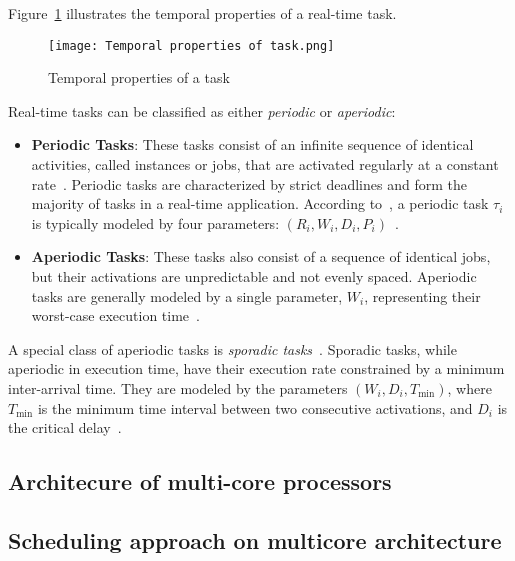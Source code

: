 \documentclass[conference]{IEEEtran}
\begin{document}
Figure~\ref{fig:temporal_properties_of_task} illustrates the temporal properties of a real-time task.

\begin{figure}[h!]
    \centering
    \texttt{[image: Temporal properties of task.png]}
    \caption{Temporal properties of a task}
    \label{fig:temporal_properties_of_task}
\end{figure}

Real-time tasks can be classified as either \textit{periodic} or \textit{aperiodic}:
\begin{itemize}
    \item \textbf{Periodic Tasks}: These tasks consist of an infinite sequence of identical activities, called instances or jobs, that are activated regularly at a constant rate~\cite{butazo99}. Periodic tasks are characterized by strict deadlines and form the majority of tasks in a real-time application. According to~\cite{french18}, a periodic task $\tau_i$ is typically modeled by four parameters: $(R_i, W_i, D_i, P_i)$~\cite{AbdallahGB24}.
    
    \item \textbf{Aperiodic Tasks}: These tasks also consist of a sequence of identical jobs, but their activations are unpredictable and not evenly spaced. Aperiodic tasks are generally modeled by a single parameter, $W_i$, representing their worst-case execution time~\cite{AbdallahGB24}.
\end{itemize}

A special class of aperiodic tasks is \textit{sporadic tasks}~\cite{butazo99}. Sporadic tasks, while aperiodic in execution time, have their execution rate constrained by a minimum inter-arrival time. They are modeled by the parameters $(W_i, D_i, T_{\text{min}})$, where $T_{\text{min}}$ is the minimum time interval between two consecutive activations, and $D_i$ is the critical delay~\cite{AbdallahGB24}.




\subsection{Architecure of multi-core processors}
\label{subsec: architecture of multi-core processors}

\subsection{Scheduling approach on multicore architecture}
\label{subsec: scheduling approach on multicore architecture}
\end{document}
